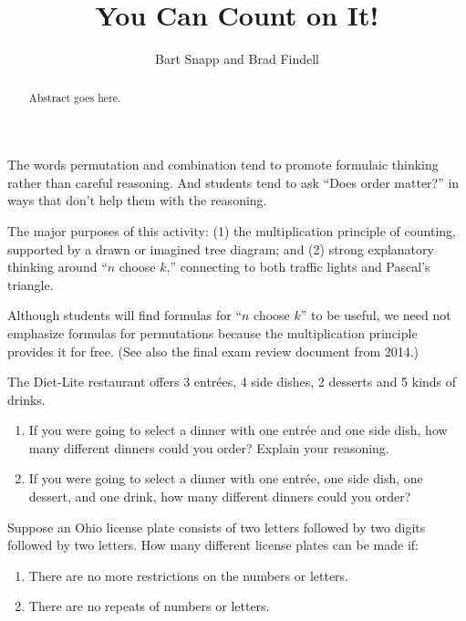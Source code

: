 \documentclass{ximera}
\title{You Can Count on It!}
\author{Bart Snapp and Brad Findell}
\begin{document}
\begin{abstract}
Abstract goes here.  
\end{abstract}
\maketitle

\label{A:countOnIt}
\begin{teachingnote}
 The words permutation and combination tend to promote formulaic thinking rather than careful reasoning.  And students tend to ask ``Does order matter?'' in ways that don't help them with the reasoning. 

The major purposes of this activity: (1) the multiplication principle of counting, supported by a drawn or imagined tree diagram; and (2) strong explanatory thinking around ``$n$ choose $k$,'' connecting to both traffic lights and Pascal's triangle.  

Although students will find formulas for ``$n$ choose $k$'' to be useful, we need not emphasize formulas for permutations because the multiplication principle provides it for free.   (See also the final exam review document from 2014.)
\end{teachingnote}

\begin{problem}
The Diet-Lite restaurant offers 3 entr\'ees, 4 side dishes, 2 desserts
and 5 kinds of drinks.  
\begin{enumerate}
\item If you were going to select a dinner with one
entr\'ee and one side dish, how many different dinners could you order?  Explain your reasoning.  
\item If you were going to select a dinner with one
entr\'ee, one side dish, one dessert, and one drink, how many different
dinners could you order?
\end{enumerate}
\end{problem}

\begin{problem}
Suppose an Ohio license plate consists of two letters followed by two
digits followed by two letters.  How many different
license plates can be made if: 
\begin{enumerate}
\item There are no more restrictions on the
numbers or letters.
\item  There are no repeats of numbers or letters.
\end{enumerate}
\end{problem}
\end{document}
